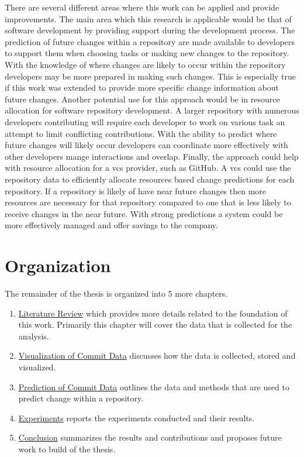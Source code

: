 There are several different areas where this work can be applied and provide improvements. The main area which this research is applicable would be that of software development by providing support during the development process. The prediction of future changes within a repository are made available to developers to support them when choosing tasks or making new changes to the repository. With the knowledge of where changes are likely to occur within the repository developers may be more prepared in making such changes. This is especially true if this work was extended to provide more specific change information about future changes. Another potential use for this approach would be in resource allocation for software repository development. A larger repository with numerous developers contributing will require each developer to work on various task an attempt to limit conflicting contributions. With the ability to predict where future changes will likely occur developers can coordinate more effectively with other developers mange interactions and overlap. Finally, the approach could help with resource allocation for a \gls{vcs} provider, such as GitHub. A \gls{vcs} could use the repository data to efficiently allocate resources based change predictions for each repository. If a repository is likely of have near future changes then more resources are necessary for that repository compared to one that is less likely to receive changes in the near future. With strong predictions a system could be more effectively managed and offer savings to the company.

\section{Organization}

The remainder of the thesis is organized into 5 more chapters.

\begin{enumerate}
\item \hyperref[chap:related_works]{Literature Review} which provides more details related to the foundation of this work. Primarily this chapter will cover the data that is collected for the analysis.
\item \hyperref[chap:visualization]{Visualization of Commit Data} discusses how the data is collected, stored and visualized.
\item \hyperref[chap:prediction]{Prediction of Commit Data} outlines the data and methods that are used to predict change within a repository.
\item \hyperref[chap:experiments]{Experiments} reports the experiments conducted and their results.
\item \hyperref[chap:conclusions]{Conclusion} summarizes the results and contributions and proposes future work to build of the thesis.
\end{enumerate}

